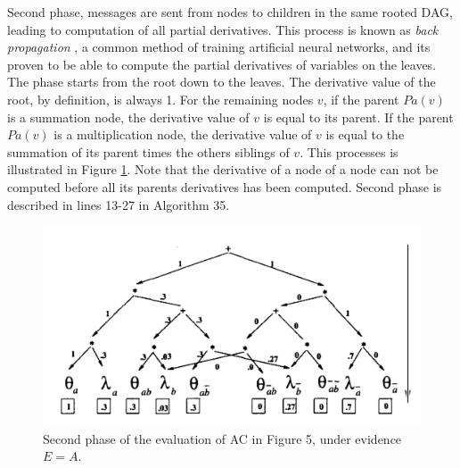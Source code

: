 \documentclass[twoside,11pt]{article}
\begin{document}
Second phase, messages are sent from nodes to children in the same rooted DAG, leading to computation of all partial derivatives.
This process is known as \emph{back propagation} \citep{rumelhart1988learning}, a common method of training artificial neural networks, and its proven to be able to compute the partial derivatives of variables on the leaves.
The phase starts from the root down to the leaves.
The derivative value of the root, by definition, is always 1.
For the remaining nodes $v$, if the parent $Pa(v)$ is a summation node, the derivative value of $v$ is equal to its parent.
If the parent $Pa(v)$ is a multiplication node, the derivative value of $v$ is equal to the summation of its parent times the others siblings of $v$.
This processes is illustrated in Figure \ref{fig:deri}.
Note that the derivative of a node of a node can not be computed before all its parents derivatives has been computed.
Second phase is described in lines 13-27 in Algorithm 35.

\begin{figure}[!htb]
    \begin{center}
    	\includegraphics[width=\columnwidth]{figures/deriv.png}
		\caption{Second phase of the evaluation of AC in Figure 5, under evidence $E=A$.}
		\label{fig:deri}
    \end{center}
\end{figure}
\end{document}

